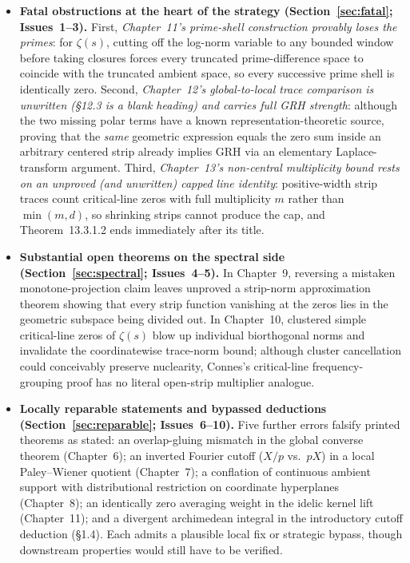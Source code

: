 \documentclass[11pt,letterpaper]{article}
\begin{document}
\begin{itemize}[leftmargin=1.5em,itemsep=2.5pt,topsep=2pt]
\item \textbf{Fatal obstructions at the heart of the strategy (Section~\ref{sec:fatal}; Issues~1--3).} First, \emph{Chapter~11's prime-shell construction provably loses the primes}: for $\zeta(s)$, cutting off the log-norm variable to any bounded window before taking closures forces every truncated prime-difference space to coincide with the truncated ambient space, so every successive prime shell is identically zero. Second, \emph{Chapter~12's global-to-local trace comparison is unwritten (\S12.3 is a blank heading) and carries full GRH strength}: although the two missing polar terms have a known representation-theoretic source, proving that the \emph{same} geometric expression equals the zero sum inside an arbitrary centered strip already implies GRH via an elementary Laplace-transform argument. Third, \emph{Chapter~13's non-central multiplicity bound rests on an unproved (and unwritten) capped line identity}: positive-width strip traces count critical-line zeros with full multiplicity $m$ rather than $\min(m,d)$, so shrinking strips cannot produce the cap, and Theorem~13.3.1.2 ends immediately after its title.
\item \textbf{Substantial open theorems on the spectral side (Section~\ref{sec:spectral}; Issues~4--5).} In Chapter~9, reversing a mistaken monotone-projection claim leaves unproved a strip-norm approximation theorem showing that every strip function vanishing at the zeros lies in the geometric subspace being divided out. In Chapter~10, clustered simple critical-line zeros of $\zeta(s)$ blow up individual biorthogonal norms and invalidate the coordinatewise trace-norm bound; although cluster cancellation could conceivably preserve nuclearity, Connes's critical-line frequency-grouping proof has no literal open-strip multiplier analogue.
\item \textbf{Locally reparable statements and bypassed deductions (Section~\ref{sec:reparable}; Issues~6--10).} Five further errors falsify printed theorems as stated: an overlap-gluing mismatch in the global converse theorem (Chapter~6); an inverted Fourier cutoff ($X/p$ vs.\ $pX$) in a local Paley--Wiener quotient (Chapter~7); a conflation of continuous ambient support with distributional restriction on coordinate hyperplanes (Chapter~8); an identically zero averaging weight in the idelic kernel lift (Chapter~11); and a divergent archimedean integral in the introductory cutoff deduction (\S1.4). Each admits a plausible local fix or strategic bypass, though downstream properties would still have to be verified.
\end{itemize}
\end{document}
